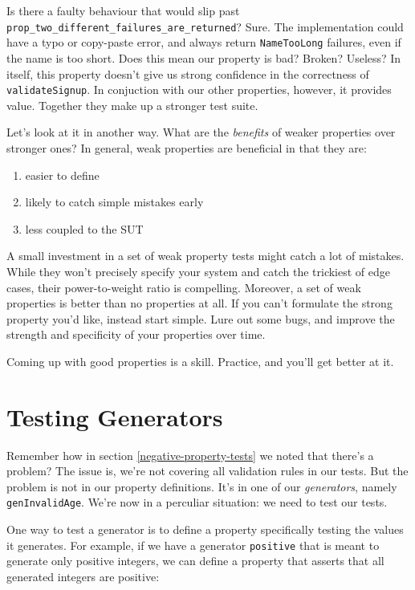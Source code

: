 Is there a faulty behaviour that would slip past
\texttt{prop\_two\_different\_failures\_are\_returned}? Sure. The
implementation could have a typo or copy-paste error, and always return
\texttt{NameTooLong} failures, even if the name is too short. Does this
mean our property is bad? Broken? Useless? 
In itself, this property doesn't give us strong confidence in the
correctness of \texttt{validateSignup}. In conjuction with our other
properties, however, it provides value. Together they make up a stronger
test suite.

Let's look at it in another way. What are the \emph{benefits} of weaker
properties over stronger ones? In general, weak properties are
beneficial in that they are:

\begin{enumerate}
\item
  easier to define
\item
  likely to catch simple mistakes early
\item
  less coupled to the SUT
\end{enumerate}
A small investment in a set of weak property tests might catch a lot of
mistakes. While they won't precisely specify your system and catch the
trickiest of edge cases, their power-to-weight ratio is compelling.
Moreover, a set of weak properties is better than no properties at all.
If you can't formulate the strong property you'd like, instead start
simple. Lure out some bugs, and improve the strength and specificity of
your properties over time.

Coming up with good properties is a skill. Practice, and you'll get
better at it.

\section{Testing Generators}
\label{testing-generators}

Remember how in section 
\ref{negative-property-tests} we noted that there's a problem? The issue is, we're not
covering all validation rules in our tests. But the problem is not in
our property definitions. It's in one of our \emph{generators}, namely
\texttt{genInvalidAge}. We're now in a perculiar situation: we need to
test our tests.

One way to test a generator is to define a property specifically testing
the values it generates. For example, if we have a generator
\texttt{positive} that is meant to generate only positive integers, we
can define a property that asserts that all generated integers are
positive:

